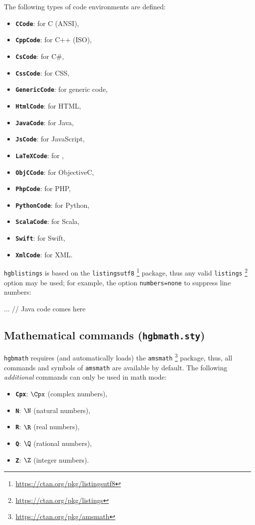 \documentclass[english]{hgbarticle}
\begin{document}
The following types of code environments are defined:%
%
\begin{itemize}
    \item \textbf{\texttt{CCode}}: for C (ANSI),
    \item \textbf{\texttt{CppCode}}: for C++ (ISO),
    \item \textbf{\texttt{CsCode}}: for C\#,
    \item \textbf{\texttt{CssCode}}: for CSS,
    \item \textbf{\texttt{GenericCode}}: for generic code,
    \item \textbf{\texttt{HtmlCode}}: for HTML,
    \item \textbf{\texttt{JavaCode}}: for Java,
    \item \textbf{\texttt{JsCode}}: for JavaScript,
    \item \textbf{\texttt{LaTeXCode}}: for \latex,
    \item \textbf{\texttt{ObjCCode}}: for ObjectiveC,
    \item \textbf{\texttt{PhpCode}}: for PHP,
    \item \textbf{\texttt{PythonCode}}: for Python,
    \item \textbf{\texttt{ScalaCode}}: for Scala,
    \item \textbf{\texttt{Swift}}: for Swift,
    \item \textbf{\texttt{XmlCode}}: for XML.
\end{itemize}
%
\texttt{hgblistings} is based on the \texttt{listingsutf8}%
\footnote{\url{https://ctan.org/pkg/listingsutf8}}
package, thus any valid \texttt{listings}%
\footnote{\url{https://ctan.org/pkg/listings}}
option may be used; for example, the option \texttt{numbers=none} to suppress
line numbers:
%
\begin{LaTeXCode}[numbers=none]
    \begin{JavaCode}[numbers=none]
    ... // Java code comes here
    \end{JavaCode}
\end{LaTeXCode}


\subsection{Mathematical commands (\texttt{hgbmath.sty})}

\texttt{hgbmath} requires (and automatically loads) the \texttt{amsmath}%
\footnote{\url{https://ctan.org/pkg/amsmath}}
package, thus, all commands and symbols of \texttt{amsmath} are available by
default. The following \emph{additional} commands can only be used in math mode:
%
\begin{itemize}
    \item \textbf{\texttt{{\bs}Cpx}}: $\Cpx$ (complex numbers),
    \item \textbf{\texttt{{\bs}N}}: $\N$ (natural numbers),
    \item \textbf{\texttt{{\bs}R}}: $\R$ (real numbers),
    \item \textbf{\texttt{{\bs}Q}}: $\Q$ (rational numbers),
    \item \textbf{\texttt{{\bs}Z}}: $\Z$ (integer numbers).
\end{itemize}
\end{document}
